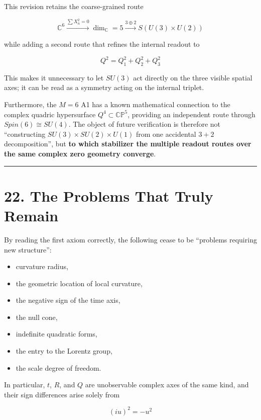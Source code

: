 \documentclass[
  a4paper,
]{article}
\providecommand{\tightlist}{%
  \setlength{\itemsep}{0pt}\setlength{\parskip}{0pt}}
\begin{document}
This revision retains the coarse-grained route

\[
\mathbb C^6\xrightarrow{\sum X_n^2=0}\dim_{\mathbb C}=5\xrightarrow{3\oplus2}S(U(3)\times U(2))
\]

while adding a second route that refines the internal readout to

\[
Q^2=Q_1^2+Q_2^2+Q_3^2
\]

This makes it unnecessary to let \(SU(3)\) act directly on the three
visible spatial axes; it can be read as a symmetry acting on the
internal triplet.

Furthermore, the \(M=6\) A1 has a known mathematical connection to the
complex quadric hypersurface \(Q^4\subset\mathbb{CP}^5\), providing an
independent route through \(Spin(6)\cong SU(4)\). The object of future
verification is therefore not ``constructing
\(SU(3)\times SU(2)\times U(1)\) from one accidental \(3+2\)
decomposition'', but \textbf{to which stabilizer the multiple readout
routes over the same complex zero geometry converge}.

\begin{center}\rule{0.5\linewidth}{0.5pt}\end{center}

\section{22. The Problems That Truly
Remain}\label{the-problems-that-truly-remain}

By reading the first axiom correctly, the following cease to be
``problems requiring new structure'':

\begin{itemize}
\tightlist
\item
  curvature radius,
\item
  the geometric location of local curvature,
\item
  the negative sign of the time axis,
\item
  the null cone,
\item
  indefinite quadratic forms,
\item
  the entry to the Lorentz group,
\item
  the scale degree of freedom.
\end{itemize}

In particular, \(t\), \(R\), and \(Q\) are unobservable complex axes of
the same kind, and their sign differences arise solely from

\[
\boxed{(iu)^2=-u^2}
\]
\end{document}

